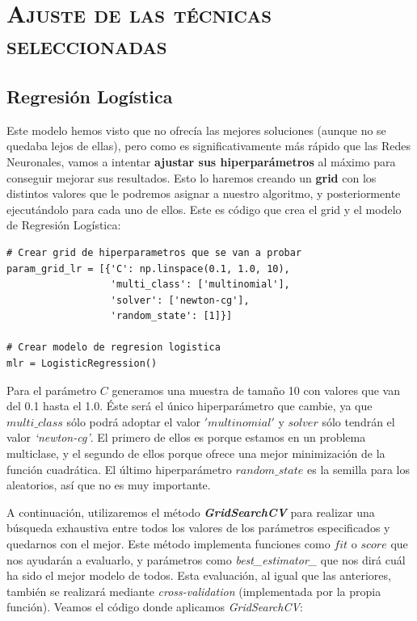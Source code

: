 \documentclass[11pt,a4paper]{article}
\begin{document}
\section{\textsc{Ajuste de las técnicas seleccionadas}}

\subsection{Regresión Logística}

Este modelo hemos visto que no ofrecía las mejores soluciones (aunque no se quedaba lejos de ellas), pero como es significativamente más
rápido que las Redes Neuronales, vamos a intentar \textbf{ajustar sus hiperparámetros} al máximo para conseguir mejorar sus resultados. Esto lo
haremos creando un \textbf{grid} con los distintos valores que le podremos asignar a nuestro algoritmo, y posteriormente ejecutándolo para cada uno
de ellos. Este es código que crea el grid y el modelo de Regresión Logística:

\begin{lstlisting}
# Crear grid de hiperparametros que se van a probar
param_grid_lr = [{'C': np.linspace(0.1, 1.0, 10),
                  'multi_class': ['multinomial'],
                  'solver': ['newton-cg'],
                  'random_state': [1]}]

# Crear modelo de regresion logistica
mlr = LogisticRegression()
\end{lstlisting}

Para el parámetro $C$ generamos una muestra de tamaño 10 con valores que van del 0.1 hasta el 1.0. Éste será el único hiperparámetro que
cambie, ya que $multi\_class$ sólo podrá adoptar el valor $'multinomial'$ y $solver$ sólo tendrán el valor \textit{`newton-cg'}. El primero de
ellos es porque estamos en un problema multiclase, y el segundo de ellos porque ofrece una mejor minimización de la función cuadrática. El
último hiperparámetro $random\_state$ es la semilla para los aleatorios, así que no es muy importante.

A continuación, utilizaremos el método \textbf{\textit{GridSearchCV}}\cite{GridSearchCV} para realizar una búsqueda exhaustiva entre todos
los valores de los parámetros especificados y quedarnos con el mejor. Este método implementa funciones como $fit$ o $score$ que nos
ayudarán a evaluarlo, y parámetros como \textit{best\_estimator\_} que nos dirá cuál ha sido el mejor modelo de todos. Esta evaluación, al igual
que las anteriores, también se realizará mediante \textit{cross-validation} (implementada por la propia función). Veamos el código donde
aplicamos \textit{GridSearchCV}:
\end{document}
